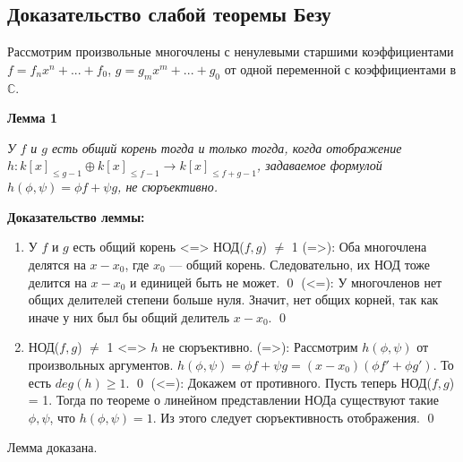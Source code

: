 \documentclass[a4paper, 12pt]{article}
\begin{document}
\subsection{Доказательство слабой теоремы Безу}

Рассмотрим произвольные многочлены с ненулевыми старшими коэффициентами $f=f_nx^n + ... + f_0$, $g=g_mx^m + ... + g_0$ от одной переменной с коэффициентами в $\mathbb{C}$.

\textbf{Лемма 1}

\textit{У $f$ и $g$ есть общий корень тогда и только тогда, когда отображение $h:k[x]_{\leq g-1} \oplus k[x]_{\leq f-1} \rightarrow k[x]_{\leq f+g-1}$, задаваемое формулой $h(\phi,\psi) = \phi f + \psi g$, не сюръективно.}\newline

\textbf{Доказательство леммы:}
\begin{enumerate}
  \item У $f$ и $g$ есть общий корень <=> НОД($f,g$) $\neq$ 1\newline
  (=>): Оба многочлена делятся на $x-x_0$, где $x_0$ --- общий корень. Следовательно, их НОД тоже делится на $x-x_0$ и единицей быть не может. \qed\newline
  (<=): У многочленов нет общих делителей степени больше нуля. Значит, нет общих корней, так как иначе у них был бы общий делитель $x-x_0$. \qed
  \item НОД($f,g$) $\neq$ 1 <=> $h$ не сюръективно.\newline
  (=>): Рассмотрим $h(\phi,\psi)$ от произвольных аргументов. $h(\phi,\psi)=\phi f + \psi g=(x-x_0)(\phi f' + \phi g')$. То есть $deg(h) \geq 1$. \qed\newline
  (<=): Докажем от противного. Пусть теперь НОД($f,g$) = 1. Тогда по теореме о линейном представлении НОДа существуют такие $\phi,\psi$, что $h(\phi,\psi)=1$. Из этого следует сюръективность отображения. \qed
\end{enumerate}
Лемма доказана.
\end{document}

